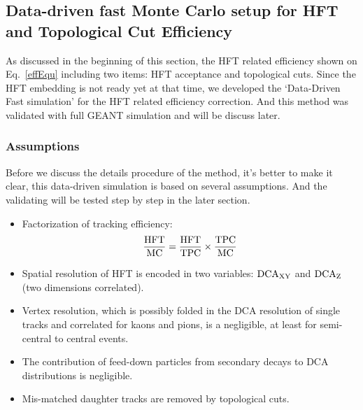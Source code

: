\subsection{Data-driven fast Monte Carlo setup for HFT and Topological Cut Efficiency}

As discussed in the beginning of this section, the HFT related efficiency shown on Eq.~\ref{effEqu} including two items: HFT acceptance and topological cuts. Since the HFT embedding is not ready yet at that time, we developed the `Data-Driven Fast simulation' for the HFT related efficiency correction. And this method was validated with full GEANT simulation and will be discuss later.

\subsubsection{Assumptions}
\label{assumptions}
Before we discuss the details procedure of the method, it's better to make it clear, this data-driven simulation is based on several assumptions. And the validating will be tested step by step in the later section.
\begin{itemize}
\item Factorization of tracking efficiency:
\begin{equation}
\frac{\textup{HFT}}{\textup{MC}} = \frac{\textup{HFT}}{\textup{TPC}} \times \frac{\textup{TPC}}{\textup{MC}}
\label{efffact}
\end{equation}
\item Spatial resolution of HFT is encoded in two variables: $\textup{DCA}_{\textup{XY}}$ and $\textup{DCA}_{\textup{Z}}$ (two dimensions correlated).
\item Vertex resolution, which is possibly folded in the DCA resolution of single tracks and correlated for kaons and pions, is a negligible, at least for semi-central to central events.
\item The contribution of feed-down particles from secondary decays to DCA distributions is negligible.
\item Mis-matched daughter tracks are removed by topological cuts.
\end{itemize}

